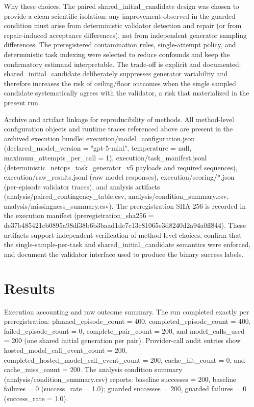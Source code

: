 \documentclass[conference]{IEEEtran}
\begin{document}
Why these choices. The paired shared\_initial\_candidate design was chosen to provide a clean scientific isolation: any improvement observed in the guarded condition must arise from deterministic validator detection and repair (or from repair-induced acceptance differences), not from independent generator sampling differences. The preregistered contamination rules, single-attempt policy, and deterministic task indexing were selected to reduce confounds and keep the confirmatory estimand interpretable. The trade-off is explicit and documented: shared\_initial\_candidate deliberately suppresses generator variability and therefore increases the risk of ceiling/floor outcomes when the single sampled candidate systematically agrees with the validator, a risk that materialized in the present run.

Archive and artifact linkage for reproducibility of methods. All method-level configuration objects and runtime traces referenced above are present in the archived execution bundle: execution/model\_configuration.json (declared\_model\_version = "gpt-5-mini", temperature = null, maximum\_attempts\_per\_call = 1), execution/task\_manifest.jsonl (deterministic\_netops\_task\_generator\_v5 payloads and required sequences), execution/raw\_results.jsonl (raw model responses), execution/scoring/*.json (per-episode validator traces), and analysis artifacts (analysis/paired\_contingency\_table.csv, analysis/condition\_summary.csv, analysis/missingness\_summary.csv). The preregistration SHA-256 is recorded in the execution manifest (preregistration\_sha256 = de37b485\allowbreak{}421cb089\allowbreak{}5a98df38\allowbreak{}b6b3baad\allowbreak{}1dc7c13c\allowbreak{}81065e3d\allowbreak{}8240d2a9\allowbreak{}4a0ff844). These artifacts support independent verification of method-level choices, confirm that the single-sample-per-task and shared\_initial\_candidate semantics were enforced, and document the validator interface used to produce the binary success labels.

\section{Results}
Execution accounting and raw outcome summary. The run completed exactly per preregistration: planned\_episode\_count = 400, completed\_episode\_count = 400, failed\_episode\_count = 0, complete\_pair\_count = 200, and model\_calls\_used = 200 (one shared initial generation per pair). Provider-call audit entries show hosted\_model\_call\_event\_count = 200, completed\_hosted\_model\_call\_event\_count = 200, cache\_hit\_count = 0, and cache\_miss\_count = 200. The analysis condition summary (analysis/condition\_summary.csv) reports: baseline successes = 200, baseline failures = 0 (success\_rate = 1.0); guarded successes = 200, guarded failures = 0 (success\_rate = 1.0).
\end{document}
